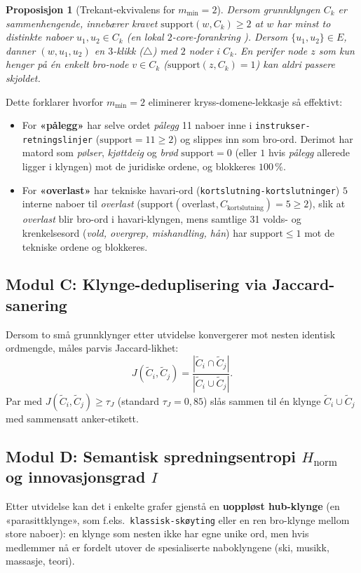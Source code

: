 \documentclass[11pt,a4paper]{article}
\newtheorem{proposition}{Proposisjon}
\begin{document}
\begin{proposition}[Trekant-ekvivalens for $m_{\min} = 2$]
Dersom grunnklyngen $C_k$ er sammenhengende, innebærer kravet $\text{support}(w, C_k) \ge 2$ at $w$ har minst to distinkte naboer $u_1, u_2 \in C_k$ (en lokal $2$-core-forankring \cite{seidman1983network}). Dersom $\{u_1, u_2\} \in E$, danner $(w, u_1, u_2)$ en $3$-klikk ($\triangle$) med $2$ noder i $C_k$. En perifer node $z$ som kun henger på én enkelt bro-node $v \in C_k$ ($\text{support}(z, C_k) = 1$) kan aldri passere skjoldet.
\end{proposition}

Dette forklarer hvorfor $m_{\min} = 2$ eliminerer kryss-domene-lekkasje så effektivt:
\begin{itemize}
  \item For \textbf{«pålegg»} har selve ordet \emph{pålegg} 11 naboer inne i \texttt{instrukser-retningslinjer} ($\text{support} = 11 \ge 2$) og slippes inn som bro-ord. Derimot har matord som \emph{pølser}, \emph{kjøttdeig} og \emph{brød} $\text{support} = 0$ (eller $1$ hvis \emph{pålegg} allerede ligger i klyngen) mot de juridiske ordene, og blokkeres $100\,\%$.
  \item For \textbf{«overlast»} har tekniske havari-ord (\texttt{kortslutning-kortslutninger}) $5$ interne naboer til \emph{overlast} ($\text{support}(\text{overlast}, C_{\text{kortslutning}}) = 5 \ge 2$), slik at \emph{overlast} blir bro-ord i havari-klyngen, mens samtlige 31 volds- og krenkelsesord (\emph{vold, overgrep, mishandling, hån}) har $\text{support} \le 1$ mot de tekniske ordene og blokkeres.
\end{itemize}

\subsection{Modul C: Klynge-deduplisering via Jaccard-sanering}
Dersom to små grunnklynger etter utvidelse konvergerer mot nesten identisk ordmengde, måles parvis Jaccard-likhet:
\begin{equation}
  J(\widetilde{C}_i, \widetilde{C}_j) = \frac{|\widetilde{C}_i \cap \widetilde{C}_j|}{|\widetilde{C}_i \cup \widetilde{C}_j|}.
\end{equation}
Par med $J(\widetilde{C}_i, \widetilde{C}_j) \ge \tau_J$ (standard $\tau_J = 0{,}85$) slås sammen til én klynge $\widetilde{C}_i \cup \widetilde{C}_j$ med sammensatt anker-etikett.

\subsection{Modul D: Semantisk spredningsentropi $H_{\text{norm}}$ og innovasjonsgrad $I$}
Etter utvidelse kan det i enkelte grafer gjenstå en \textbf{uoppløst hub-klynge} (en «parasittklynge», som f.eks.\ \texttt{klassisk-skøyting} eller en ren bro-klynge mellom store naboer): en klynge som nesten ikke har egne unike ord, men hvis medlemmer nå er fordelt utover de spesialiserte naboklyngene (ski, musikk, massasje, teori).
\end{document}
